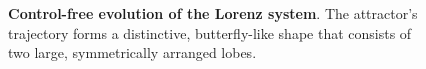 \begin{figure}[h!]
\centering
\caption{\textbf{Control-free evolution of the Lorenz system}. The attractor's trajectory forms a distinctive, butterfly-like shape that consists of two large, symmetrically arranged lobes.}
\label{fig:lorenz}
\end{figure} 
